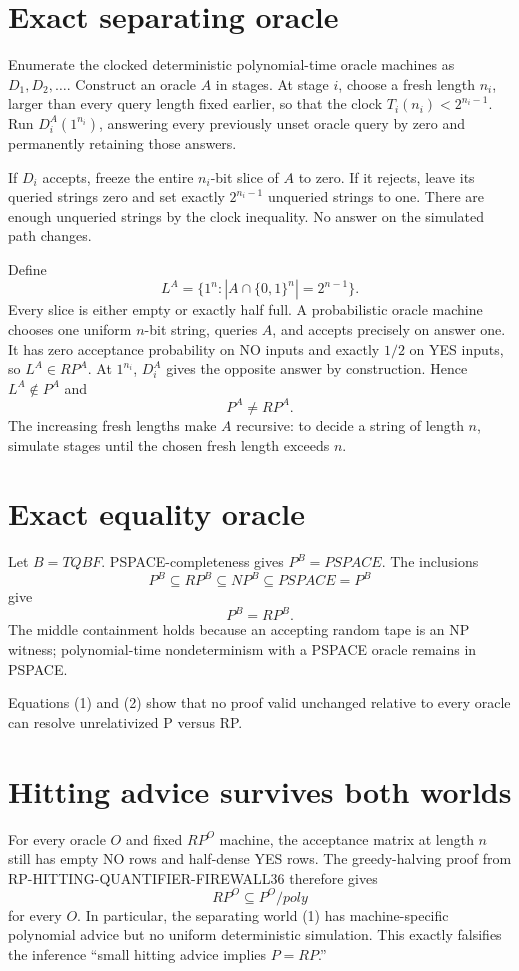 \documentclass[11pt]{article}
\begin{document}
\section*{Exact separating oracle}
Enumerate the clocked deterministic polynomial-time oracle machines as
$D_1,D_2,\ldots$.  Construct an oracle $A$ in stages.  At stage $i$, choose a
fresh length $n_i$, larger than every query length fixed earlier, so that the
clock $T_i(n_i)<2^{n_i-1}$.  Run $D_i^A(1^{n_i})$, answering every previously
unset oracle query by zero and permanently retaining those answers.

If $D_i$ accepts, freeze the entire $n_i$-bit slice of $A$ to zero.  If it
rejects, leave its queried strings zero and set exactly $2^{n_i-1}$ unqueried
strings to one.  There are enough unqueried strings by the clock inequality.
No answer on the simulated path changes.

Define
\[
 L^A=\{1^n:|A\cap\{0,1\}^n|=2^{n-1}\}.
\]
Every slice is either empty or exactly half full.  A probabilistic oracle
machine chooses one uniform $n$-bit string, queries $A$, and accepts precisely
on answer one.  It has zero acceptance probability on NO inputs and exactly
$1/2$ on YES inputs, so $L^A\in RP^A$.  At $1^{n_i}$, $D_i^A$ gives the
opposite answer by construction.  Hence $L^A\notin P^A$ and
\[
 P^A\ne RP^A.                                             \tag{1}
\]
The increasing fresh lengths make $A$ recursive: to decide a string of length
$n$, simulate stages until the chosen fresh length exceeds $n$.

\section*{Exact equality oracle}
Let $B=TQBF$.  PSPACE-completeness gives $P^B=PSPACE$.  The inclusions
\[
 P^B\subseteq RP^B\subseteq NP^B\subseteq PSPACE=P^B
\]
give
\[
 P^B=RP^B.                                                \tag{2}
\]
The middle containment holds because an accepting random tape is an NP
witness; polynomial-time nondeterminism with a PSPACE oracle remains in
PSPACE.

Equations (1) and (2) show that no proof valid unchanged relative to every
oracle can resolve unrelativized P versus RP.

\section*{Hitting advice survives both worlds}
For every oracle $O$ and fixed $RP^O$ machine, the acceptance matrix at length
$n$ still has empty NO rows and half-dense YES rows.  The greedy-halving proof
from RP-HITTING-QUANTIFIER-FIREWALL36 therefore gives
\[
 RP^O\subseteq P^O/poly
\]
for every $O$.  In particular, the separating world (1) has machine-specific
polynomial advice but no uniform deterministic simulation.  This exactly
falsifies the inference ``small hitting advice implies $P=RP$.''
\end{document}
